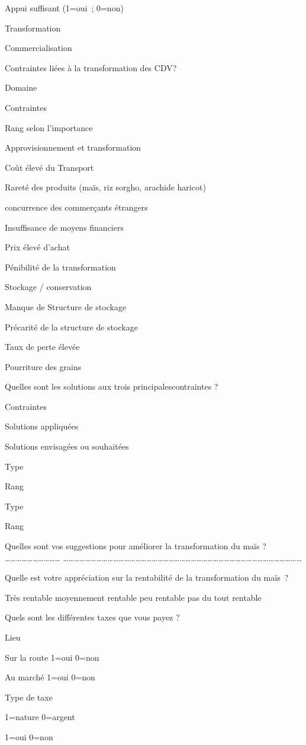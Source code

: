 \documentclass[12pt,oneside]{report}
\begin{document}
Appui suffisant (1=oui ; 0=non)

Transformation

Commercialisation

Contraintes liées à la transformation des CDV?

Domaine

Contraintes

Rang selon l’importance

Approvisionnement et transformation

Coût élevé du Transport

Rareté  des produits (maïs, riz sorgho, arachide haricot)

concurrence des commerçants étrangers

Insuffisance de moyens financiers

Prix élevé d’achat

Pénibilité de la transformation

Stockage / conservation

Manque de Structure de stockage

Précarité de la structure de stockage

Taux de perte élevée

Pourriture des grains

Quelles sont les solutions aux trois principalescontraintes ?

Contraintes

Solutions appliquées

Solutions envisagées ou souhaitées

Type

Rang

Type

Rang

Quelles sont vos suggestions pour améliorer la transformation du maïs ? ………………………… …………………………………………………………………………………………………………………

Quelle est votre appréciation sur la rentabilité de la transformation du maïs ?

Très rentable moyennement rentable peu rentable pas du tout rentable

Quels sont les différentes taxes que vous payez ?

Lieu

Sur la route 1=oui 0=non

Au marché 1=oui 0=non

Type de taxe

1=nature         0=argent

1=oui 0=non
\end{document}
